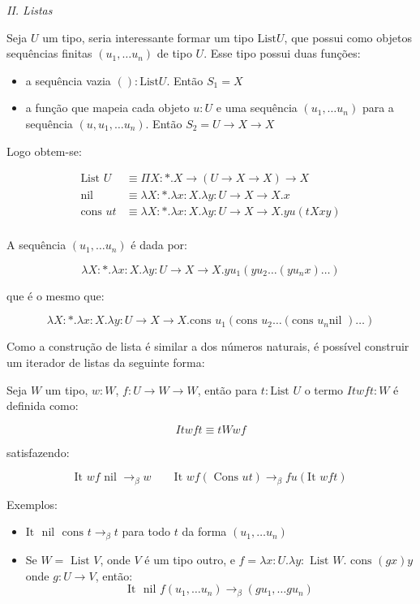 \documentclass[../main.tex]{subfiles}
\begin{document}
\emph{II. Listas}

Seja $U$ um tipo, seria interessante formar um tipo $\text{List} U$, que possui como objetos sequências finitas $(u_1, \dots u_n)$ de tipo $U$. Esse tipo possui duas funções:

\begin{itemize}
    \item a sequência vazia $() : \text{List} U$. Então $S_1 = X$
    \item a função que mapeia cada objeto $u : U$ e uma sequência $(u_1, \dots u_n)$ para a sequência $(u, u_1, \dots u_n)$. Então $S_2 = U \to X \to X$ 
\end{itemize}

Logo obtem-se:

\begin{align*}
    \text{List } U & \equiv \Pi X : \ast . X \to (U \to X \to X) \to X \\
    \text{nil}     & \equiv \lambda X : \ast . \lambda x : X . \lambda y : U \to X \to X . x \\
    \text{cons } u t     & \equiv \lambda X : \ast . \lambda x : X . \lambda y : U \to X \to X . yu(tXxy) \\
\end{align*}

A sequência $(u_1, \dots u_n)$ é dada por:

$$\lambda X : \ast . \lambda x : X . \lambda y : U \to X \to X . y u_1 (y u _2 \dots (y u_n x) \dots)$$

que é o mesmo que:

$$\lambda X : \ast . \lambda x : X . \lambda y : U \to X \to X . \text{cons } u_1 (\text{cons } u _2 \dots (\text{cons } u_n \text{nil }) \dots)$$

Como a construção de lista é similar a dos números naturais, é possível construir um iterador de listas da seguinte forma:

Seja $W$ um tipo, $w : W$, $f : U \to W \to W$, então para $t : \text{List } U$ o termo $It w f t : W$ é definida como:

$$It w f t \equiv t W w f$$

satisfazendo:

$$\text{It } w f \text{ nil } \to_{\beta} w \qquad \text{It } w f (\text{ Cons } u t) \to_{\beta} f u (\text{It } w f t)$$

Exemplos:

\begin{itemize}
    \item $\text{It } \text{ nil } \text{ cons } t \to_{\beta} t$ para todo $t$ da forma $(u_1, \dots u_n)$
    \item Se $W = \text{ List } V$, onde $V$ é um tipo outro, e $f = \lambda x : U . \lambda y :  \text{ List } W . \text{ cons } (g x) y$ onde $g : U \to V$, então: $$ \text{It } \text{ nil } f (u_1, \dots u_n) \to_{\beta} (g u_1, \dots g u_n)$$
\end{itemize}
\end{document}
